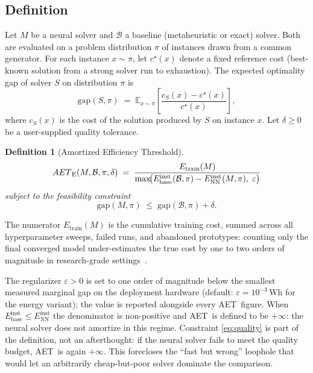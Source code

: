 \documentclass[11pt]{article}
\newtheorem{definition}{Definition}
\newcommand{\AET}{AET}
\newcommand{\AETE}{AET\textsubscript{E}}
\begin{document}
\subsection{Definition}

Let \(M\) be a neural solver and \(\mathcal{B}\) a baseline (metaheuristic or exact) solver. Both are evaluated on a problem distribution \(\pi\) of instances drawn from a common generator. For each instance \(x \sim \pi\), let \(c^\star(x)\) denote a fixed reference cost (best-known solution from a strong solver run to exhaustion). The expected optimality gap of solver \(S\) on distribution \(\pi\) is
\begin{equation}
  \mathrm{gap}(S, \pi)
  \;=\;
  \mathbb{E}_{x \sim \pi}\!\left[
    \frac{c_S(x) - c^\star(x)}{c^\star(x)}
  \right],
  \label{eq:gap}
\end{equation}
where \(c_S(x)\) is the cost of the solution produced by \(S\) on instance \(x\). Let \(\delta \geq 0\) be a user-supplied quality tolerance.

\begin{definition}[Amortized Efficiency Threshold]
\label{def:aet}
\begin{equation}
  \AETE(M, \mathcal{B}, \pi, \delta) \;=\;
  \frac{E_\text{train}(M)}
       {\max\!\bigl(E_\text{base}^\text{inst}(\mathcal{B}, \pi) - E_\text{NN}^\text{inst}(M, \pi),\;\varepsilon\bigr)}
  \label{eq:aet}
\end{equation}
subject to the feasibility constraint
\begin{equation}
  \mathrm{gap}(M, \pi) \;\leq\; \mathrm{gap}(\mathcal{B}, \pi) + \delta.
  \label{eq:quality}
\end{equation}
\end{definition}

The numerator \(E_\text{train}(M)\) is the cumulative training cost, summed across all hyperparameter sweeps, failed runs, and abandoned prototypes: counting only the final converged model under-estimates the true cost by one to two orders of magnitude in research-grade settings~\cite{henderson2020systematic}.

The regularizer \(\varepsilon > 0\) is set to one order of magnitude below the smallest measured marginal gap on the deployment hardware (default: \(\varepsilon = 10^{-3}\,\mathrm{Wh}\) for the energy variant); the value is reported alongside every \AET\ figure. When \(E_\text{base}^\text{inst} \leq E_\text{NN}^\text{inst}\) the denominator is non-positive and \AET\ is defined to be \(+\infty\): the neural solver does not amortize in this regime. Constraint \eqref{eq:quality} is part of the definition, not an afterthought: if the neural solver fails to meet the quality budget, \AET\ is again \(+\infty\). This forecloses the ``fast but wrong'' loophole that would let an arbitrarily cheap-but-poor solver dominate the comparison.
\end{document}
